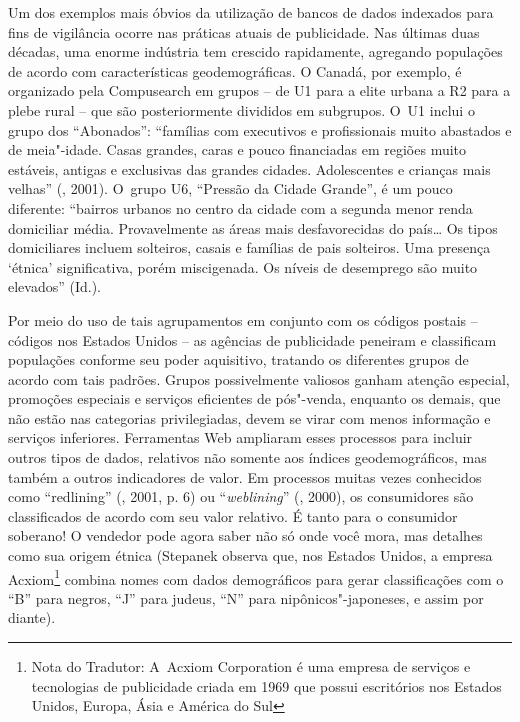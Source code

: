 Um dos exemplos mais óbvios da utilização de bancos de dados indexados
para fins de vigilância ocorre nas práticas atuais de publicidade. Nas
últimas duas décadas, uma enorme indústria tem crescido rapidamente,
agregando populações de acordo com características geodemográficas. O
Canadá, por exemplo, é organizado pela Compusearch em grupos -- de U1
para a elite urbana a R2 para a plebe rural -- que são posteriormente
divididos em subgrupos. O~U1 inclui o grupo dos ``Abonados'': ``famílias
com executivos e profissionais muito abastados e de meia"-idade. Casas
grandes, caras e pouco financiadas em regiões muito estáveis, antigas e
exclusivas das grandes cidades. Adolescentes e crianças mais velhas''
(, 2001). O~grupo U6, ``Pressão da Cidade Grande'', é um pouco
diferente: ``bairros urbanos no centro da cidade com a segunda menor
renda domiciliar média. Provavelmente as áreas mais desfavorecidas do
país\ldots{} Os tipos domiciliares incluem solteiros, casais e famílias
de pais solteiros. Uma presença `étnica' significativa, porém
miscigenada. Os níveis de desemprego são muito elevados'' (Id.).

Por meio do uso de tais agrupamentos em conjunto com os códigos postais
-- códigos  nos Estados Unidos -- as agências de publicidade
peneiram e classificam populações conforme seu poder aquisitivo,
tratando os diferentes grupos de acordo com tais padrões. Grupos
possivelmente valiosos ganham atenção especial, promoções especiais e
serviços eficientes de pós"-venda, enquanto os demais, que não estão nas
categorias privilegiadas, devem se virar com menos informação e serviços
inferiores. Ferramentas Web ampliaram esses processos para incluir
outros tipos de dados, relativos não somente aos índices
geodemográficos, mas também a outros indicadores de valor. Em processos
muitas vezes conhecidos como ``redlining'' (, 2001, p. 6) ou
``\emph{weblining}'' (, 2000), os consumidores são classificados
de acordo com seu valor relativo. É tanto para o consumidor soberano! O
vendedor pode agora saber não só onde você mora, mas detalhes como sua
origem étnica (Stepanek observa que, nos Estados Unidos, a empresa
Acxiom\footnote{Nota do Tradutor: A~Acxiom Corporation é uma empresa de
  serviços e tecnologias de publicidade criada em 1969 que possui
  escritórios nos Estados Unidos, Europa, Ásia e América do Sul} combina
nomes com dados demográficos para gerar classificações com o ``B'' para
negros, ``J'' para judeus, ``N'' para nipônicos"-japoneses, e assim por
diante).


